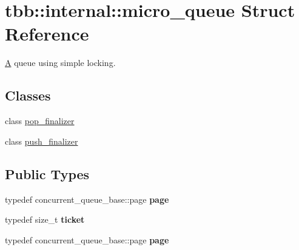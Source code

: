 \hypertarget{structtbb_1_1internal_1_1micro__queue}{}\section{tbb\+:\+:internal\+:\+:micro\+\_\+queue Struct Reference}
\label{structtbb_1_1internal_1_1micro__queue}


\hyperlink{structA}{A} queue using simple locking.  


\subsection*{Classes}
\begin{DoxyCompactItemize}
\item 
class \hyperlink{classtbb_1_1internal_1_1micro__queue_1_1pop__finalizer}{pop\+\_\+finalizer}
\item 
class \hyperlink{classtbb_1_1internal_1_1micro__queue_1_1push__finalizer}{push\+\_\+finalizer}
\end{DoxyCompactItemize}
\subsection*{Public Types}
\begin{DoxyCompactItemize}
\item 
\hypertarget{structtbb_1_1internal_1_1micro__queue_afa7239963be1c09c06dcbd0bfdfa622a}{}typedef concurrent\+\_\+queue\+\_\+base\+::page {\bfseries page}\label{structtbb_1_1internal_1_1micro__queue_afa7239963be1c09c06dcbd0bfdfa622a}

\item 
\hypertarget{structtbb_1_1internal_1_1micro__queue_ae100df0e4b20fb2cec1ea0e5ab50cad4}{}typedef size\+\_\+t {\bfseries ticket}\label{structtbb_1_1internal_1_1micro__queue_ae100df0e4b20fb2cec1ea0e5ab50cad4}

\item 
\hypertarget{structtbb_1_1internal_1_1micro__queue_afa7239963be1c09c06dcbd0bfdfa622a}{}typedef concurrent\+\_\+queue\+\_\+base\+::page {\bfseries page}\label{structtbb_1_1internal_1_1micro__queue_afa7239963be1c09c06dcbd0bfdfa622a}

\end{DoxyCompactItemize}
